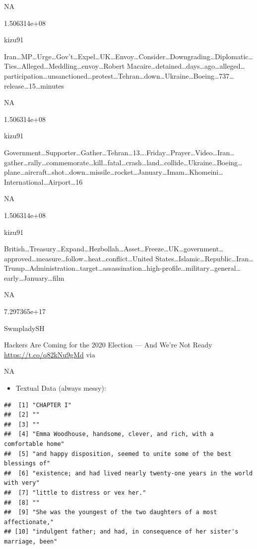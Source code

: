 \documentclass[
]{book}
\providecommand{\tightlist}{%
  \setlength{\itemsep}{0pt}\setlength{\parskip}{0pt}}
\begin{document}
NA

1.506314e+08

kizu91

Iran\ldots MP\ldots Urge\ldots Gov't\ldots Expel\ldots UK\ldots Envoy\ldots Consider\ldots Downgrading\ldots Diplomatic\ldots Ties\ldots Alleged\ldots Meddling\ldots envoy\ldots Robert Macaire\ldots detained\ldots days\ldots ago\ldots alleged\ldots participation\ldots unsanctioned\ldots protest\ldots Tehran\ldots down\ldots Ukraine\ldots Boeing\ldots737\ldots release\ldots15\ldots minutes

NA

1.506314e+08

kizu91

Government\ldots Supporter\ldots Gather\ldots Tehran\ldots13\ldots.Friday\ldots Prayer\ldots Video\ldots Iran\ldots gather\ldots rally\ldots commemorate\ldots kill\ldots fatal\ldots crash\ldots land\ldots collide\ldots Ukraine\ldots Boeing\ldots plane\ldots aircraft\ldots shot\ldots down\ldots missile\ldots rocket\ldots January\ldots Imam\ldots Khomeini\ldots International\ldots Airport\ldots16

NA

1.506314e+08

kizu91

British\ldots Treasury\ldots Expand\ldots Hezbollah\ldots Asset\ldots Freeze\ldots UK\ldots government\ldots approved\ldots measure\ldots follow\ldots heat\ldots conflict\ldots United States\ldots Islamic\ldots Republic\ldots Iran\ldots Trump\ldots Administration\ldots target\ldots assassination\ldots high-profile\ldots military\ldots general\ldots early\ldots January\ldots film

NA

7.297365e+17

SwmpladySH

Hackers Are Coming for the 2020 Election --- And We're Not Ready \url{https://t.co/q82kNu9gMd} via \citet{RollingStone}

NA

\begin{itemize}
\tightlist
\item
  Textual Data (always messy):
\end{itemize}

\begin{verbatim}
##  [1] "CHAPTER I"                                                               
##  [2] ""                                                                        
##  [3] ""                                                                        
##  [4] "Emma Woodhouse, handsome, clever, and rich, with a comfortable home"     
##  [5] "and happy disposition, seemed to unite some of the best blessings of"    
##  [6] "existence; and had lived nearly twenty-one years in the world with very" 
##  [7] "little to distress or vex her."                                          
##  [8] ""                                                                        
##  [9] "She was the youngest of the two daughters of a most affectionate,"       
## [10] "indulgent father; and had, in consequence of her sister's marriage, been"
\end{verbatim}
\end{document}
